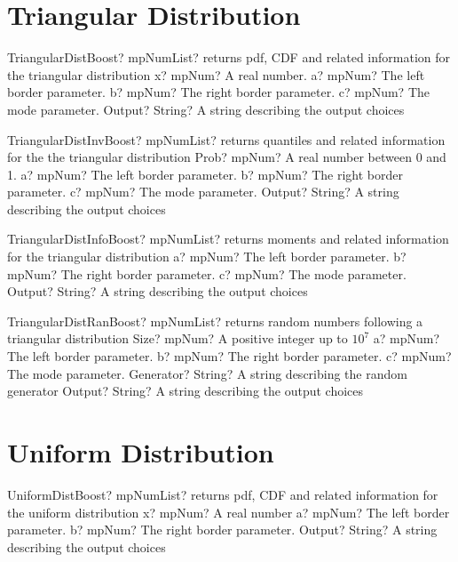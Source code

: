 \documentclass[12pt,a4paper,openany]{book}
\begin{document}
\section{Triangular Distribution}

\begin{mpFunctionsExtract}
\mpFunctionFive
{TriangularDistBoost? mpNumList? returns pdf, CDF and related information for the triangular distribution}
{x? mpNum? A real number.}
{a? mpNum? The left border parameter.}
{b? mpNum? The right border parameter.}
{c? mpNum? The mode parameter.}
{Output? String? A string describing the output choices}
\end{mpFunctionsExtract}

\begin{mpFunctionsExtract}
\mpFunctionFive
{TriangularDistInvBoost? mpNumList? returns quantiles and related information for the the triangular distribution}
{Prob? mpNum? A real number between 0 and 1.}
{a? mpNum? The left border parameter.}
{b? mpNum? The right border parameter.}
{c? mpNum? The mode parameter.}
{Output? String? A string describing the output choices}
\end{mpFunctionsExtract}

\begin{mpFunctionsExtract}
\mpFunctionFour
{TriangularDistInfoBoost? mpNumList? returns moments and related information for the triangular distribution}
{a? mpNum? The left border parameter.}
{b? mpNum? The right border parameter.}
{c? mpNum? The mode parameter.}
{Output? String? A string describing the output choices}
\end{mpFunctionsExtract}

\begin{mpFunctionsExtract}
\mpFunctionSix
{TriangularDistRanBoost? mpNumList? returns random numbers following a triangular distribution}
{Size? mpNum? A positive integer up to $10^7$}
{a? mpNum? The left border parameter.}
{b? mpNum? The right border parameter.}
{c? mpNum? The mode parameter.}
{Generator? String? A string describing the random generator}
{Output? String? A string describing the output choices}
\end{mpFunctionsExtract}

\section{Uniform Distribution}

\begin{mpFunctionsExtract}
\mpFunctionFour
{UniformDistBoost? mpNumList? returns pdf, CDF and related information for the uniform distribution}
{x? mpNum? A real number}
{a? mpNum? The left border parameter.}
{b? mpNum? The right border parameter.}
{Output? String? A string describing the output choices}
\end{mpFunctionsExtract}
\end{document}
